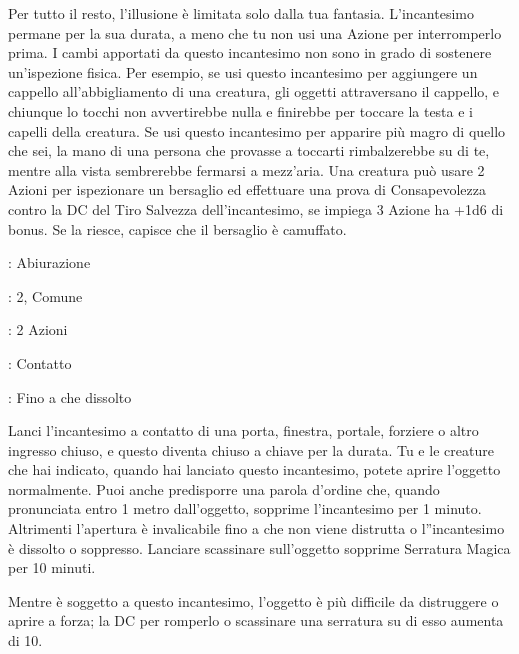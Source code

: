 \begin{multicols}{2}
Per tutto il resto, l'illusione è limitata solo dalla tua fantasia. L'incantesimo permane per la sua durata, a meno che tu non usi una Azione per interromperlo prima. I cambi apportati da questo incantesimo non sono in grado di sostenere un'ispezione fisica. Per esempio, se usi questo incantesimo per aggiungere un cappello all'abbigliamento di una creatura, gli oggetti attraversano il cappello, e chiunque lo tocchi non avvertirebbe nulla e finirebbe per toccare la testa e i capelli della creatura.
Se usi questo incantesimo per apparire più magro di quello che sei, la mano di una persona che provasse a toccarti rimbalzerebbe su di te, mentre alla vista sembrerebbe fermarsi a mezz'aria. Una creatura può usare 2 Azioni per ispezionare un bersaglio ed effettuare una prova di Consapevolezza contro la DC del Tiro Salvezza dell'incantesimo, se impiega 3 Azione ha +1d6 di bonus. Se la riesce, capisce che il bersaglio è camuffato.

\label{Arcane Lock}
\noindent\colorbox{OBSSgold!10}{
\begin{minipage}{0.95\linewidth}
\begin{description}[noitemsep, topsep=0pt, parsep=0pt, partopsep=0pt, leftmargin=0cm, labelwidth=1.3cm]
	\item[\textbf{Lista}]: Abiurazione
	\item[\textbf{Livello}]: 2, Comune
	\item[\textbf{Lancio}]: 2 Azioni
	\item[\textbf{Gittata}]: Contatto
	\item[\textbf{Durata}]: Fino a che dissolto
\end{description}
\end{minipage}}\smallskip

Lanci l'incantesimo a contatto di una porta, finestra, portale, forziere o altro ingresso chiuso, e questo diventa chiuso a chiave per la durata. Tu e le creature che hai indicato, quando hai lanciato questo incantesimo, potete aprire l'oggetto normalmente. Puoi anche predisporre una parola d'ordine che, quando pronunciata entro 1 metro dall'oggetto, sopprime l'incantesimo per 1 minuto. Altrimenti l'apertura è invalicabile fino a che non viene distrutta o l''incantesimo è dissolto o soppresso. Lanciare scassinare sull'oggetto sopprime Serratura Magica per 10 minuti.

Mentre è soggetto a questo incantesimo, l'oggetto è più difficile da distruggere o aprire a forza; la DC per romperlo o scassinare una serratura su di esso aumenta di 10.


\end{multicols}
